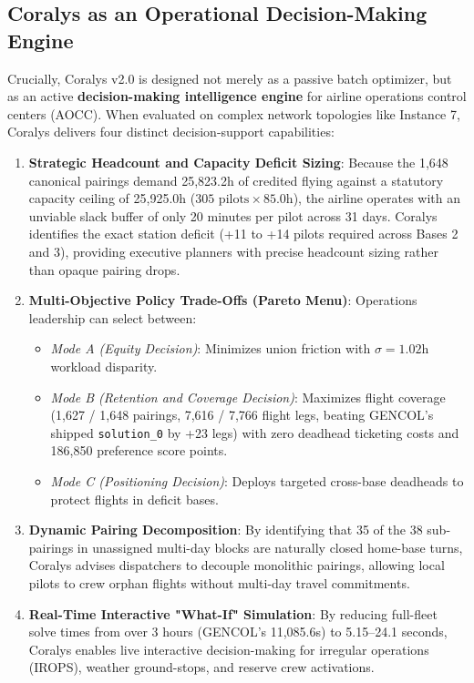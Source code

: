 \documentclass[journal]{IEEEtran}
\begin{document}
\subsection{Coralys as an Operational Decision-Making Engine}

Crucially, Coralys v2.0 is designed not merely as a passive batch optimizer, but as an active \textbf{decision-making intelligence engine} for airline operations control centers (AOCC). When evaluated on complex network topologies like Instance 7, Coralys delivers four distinct decision-support capabilities:

\begin{enumerate}
    \item \textbf{Strategic Headcount and Capacity Deficit Sizing}: Because the 1,648 canonical pairings demand 25,823.2h of credited flying against a statutory capacity ceiling of 25,925.0h ($305 \text{ pilots} \times 85.0\text{h}$), the airline operates with an unviable slack buffer of only 20 minutes per pilot across 31 days. Coralys identifies the exact station deficit (+11 to +14 pilots required across Bases 2 and 3), providing executive planners with precise headcount sizing rather than opaque pairing drops.
    \item \textbf{Multi-Objective Policy Trade-Offs (Pareto Menu)}: Operations leadership can select between:
    \begin{itemize}
        \item \emph{Mode A (Equity Decision)}: Minimizes union friction with $\sigma = 1.02$h workload disparity.
        \item \emph{Mode B (Retention and Coverage Decision)}: Maximizes flight coverage (1,627 / 1,648 pairings, 7,616 / 7,766 flight legs, beating GENCOL's shipped \texttt{solution\_0} by +23 legs) with zero deadhead ticketing costs and 186,850 preference score points.
        \item \emph{Mode C (Positioning Decision)}: Deploys targeted cross-base deadheads to protect flights in deficit bases.
    \end{itemize}
    \item \textbf{Dynamic Pairing Decomposition}: By identifying that 35 of the 38 sub-pairings in unassigned multi-day blocks are naturally closed home-base turns, Coralys advises dispatchers to decouple monolithic pairings, allowing local pilots to crew orphan flights without multi-day travel commitments.
    \item \textbf{Real-Time Interactive "What-If" Simulation}: By reducing full-fleet solve times from over 3 hours (GENCOL's 11,085.6s) to 5.15--24.1 seconds, Coralys enables live interactive decision-making for irregular operations (IROPS), weather ground-stops, and reserve crew activations.
\end{enumerate}
\end{document}

